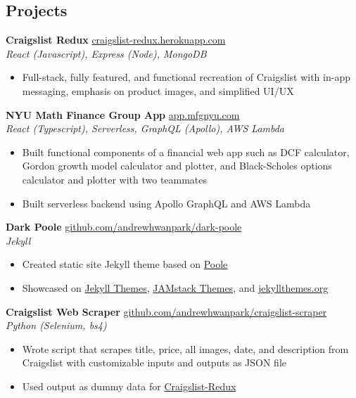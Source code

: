 \documentclass[margin]{res}
\begin{document}
\begin{resume}
	\section{Projects} 
	{\bf Craigslist Redux} \hfill \href{http://craigslist-redux.herokuapp.com}{craigslist-redux.herokuapp.com}\\
	{\it React (Javascript), Express (Node), MongoDB}
	\begin{itemize} \itemsep -2pt
		\item Full-stack, fully featured, and functional recreation of Craigslist with in-app messaging, emphasis on product images, and simplified UI/UX
	\end{itemize}
	
	{\bf NYU Math Finance Group App} \hfill\href{https://github.com/mfg-nyu/app}{app.mfgnyu.com}\\
	{\it React (Typescript), Serverless, GraphQL (Apollo), AWS Lambda}
	\begin{itemize} \itemsep -2pt
		\item Built functional components of a financial web app such as DCF calculator, Gordon growth model calculator and plotter, and Black-Scholes options calculator and plotter with two teammates
		\item Built serverless backend using Apollo GraphQL and AWS Lambda
	\end{itemize}
	
	{\bf Dark Poole} \hfill \href{https://github.com/andrewhwanpark/dark-poole}{github.com/andrewhwanpark/dark-poole}\\
	{\it Jekyll}
	\begin{itemize} \itemsep -2pt
		\item Created static site Jekyll theme based on \href{https://github.com/poole/poole}{Poole}
		\item Showcased on \href{https://jekyll-themes.com/dark-poole/}{Jekyll Themes}, \href{https://jamstackthemes.dev/theme/dark-poole/}{JAMstack Themes}, and \href{http://jekyllthemes.org/themes/dark-poole/}{jekyllthemes.org}
	\end{itemize}
	
	{\bf Craigslist Web Scraper} \hfill \href{https://github.com/andrewhwanpark/craigslist-scraper}{github.com/andrewhwanpark/craigslist-scraper}\\
	{\it Python (Selenium, bs4)}
	\begin{itemize} \itemsep -2pt
		\item Wrote script that scrapes title, price, all images, date, and description from Craigslist with customizable inputs and outputs as JSON file
		\item Used output as dummy data for \href{https://github.com/andrewhwanpark/craigslist-redux}{Craigslist-Redux}
	\end{itemize}
	

\end{resume}
\end{document}
